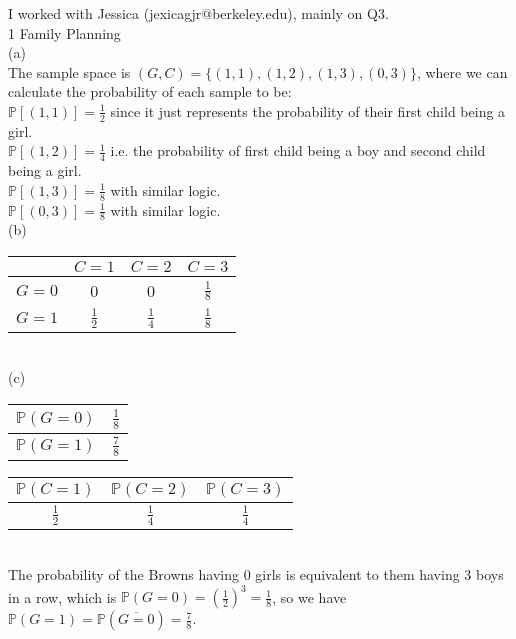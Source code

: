 \documentclass{article}
\begin{document}
I worked with Jessica (jexicagjr@berkeley.edu), mainly on Q3. \\[1cm]
{\Large 1 Family Planning} \\[.5cm]
{\color{red} (a) } \\

The sample space is {\color{red} $(G, C) = \{ (1,1), (1,2), (1,3), (0,3) \}$}, where we can calculate the probability of each sample to be: \\

{\color{red} $\mathbb{P}[(1,1)] = \frac{1}{2}$} since it just represents the probability of their first child being a girl. \\

{\color{red} $\mathbb{P}[(1,2)] = \frac{1}{4}$} i.e. the probability of first child being a boy and second child being a girl. \\

{\color{red} $\mathbb{P}[(1,3)] = \frac{1}{8}$} with similar logic. \\

{\color{red} $\mathbb{P}[(0,3)] = \frac{1}{8}$} with similar logic. \\[.5cm]
{\color{red} (b) }
\begin{tabular}{|c||c|c|c|} 
	\hline
	 & $C = 1$ & $C = 2$ & $C = 3$ \\
	\hline
	\hline
	$G = 0$ & 0 & 0 & $\frac{1}{8}$ \\[.1cm]
	\hline
	$G = 1$ & $\frac{1}{2}$ & $\frac{1}{4}$ & $\frac{1}{8}$ \\[.1cm]
	\hline
\end{tabular} \\[.5cm]
{\color{red} (c) }
\begin{tabular}{|c||c|}
	\hline
	$\mathbb{P}(G = 0)$ & $\frac{1}{8}$ \\[.1cm]
	\hline
	$\mathbb{P}(G = 1)$ & $\frac{7}{8}$ \\[.1cm]
	\hline
\end{tabular}\indent
\begin{tabular}{|c|c|c|} 
	\hline
	$\mathbb{P}(C = 1)$ & $\mathbb{P}(C = 2)$ & $\mathbb{P}(C = 3)$ \\
	\hline
	\hline
	$\frac{1}{2}$ & $\frac{1}{4}$ & $\frac{1}{4}$ \\[.1cm]
	\hline
\end{tabular}\\

The probability of the Browns having 0 girls is equivalent to them having 3 boys in a row, which is $\mathbb{P}(G=0) = (\frac{1}{2})^3 = \frac{1}{8}$, so we have $\mathbb{P}(G=1) = \mathbb{P}(\overline{G=0}) = \frac{7}{8}$. \\
\end{document}
